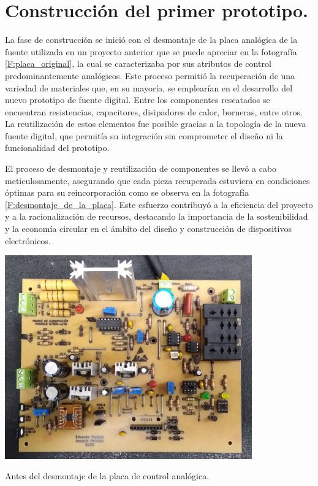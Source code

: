 \section{Construcción del primer prototipo.}
La fase de construcción se inició con el desmontaje de la placa analógica de la fuente utilizada en un proyecto anterior que se puede apreciar en la fotografía \ref{F:placa_original}, la cual se caracterizaba por sus atributos de control predominantemente analógicos. Este proceso permitió la recuperación de una variedad de materiales que, en su mayoría, se emplearían en el desarrollo del nuevo prototipo de fuente digital. Entre los componentes rescatados se encuentran resistencias, capacitores, disipadores de calor, borneras, entre otros. La reutilización de estos elementos fue posible gracias a la topología de la nueva fuente digital, que permitía su integración sin comprometer el diseño ni la funcionalidad del prototipo.  \par 
El proceso de desmontaje y reutilización de componentes se llevó a cabo meticulosamente, asegurando que cada pieza recuperada estuviera en condiciones óptimas para su reincorporación como se observa en la fotografía \ref{F:desmontaje_de_la_placa}. Este esfuerzo contribuyó a la eficiencia del proyecto y a la racionalización de recursos, destacando la importancia de la sostenibilidad y la economía circular en el ámbito del diseño y construcción de dispositivos electrónicos.\par
\begin{foto}[H]
    \centering
    \includegraphics[width=0.8\textwidth]{./imagenes/fotos/placa_original.jpg}
    \caption{Antes del desmontaje de la placa de control analógica.}
    \label{F:placa_original}
\end{foto}

